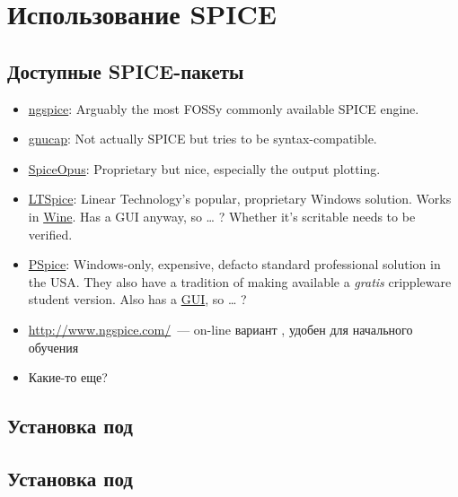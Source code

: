 
\chapter{Использование SPICE}

\section{Доступные SPICE-пакеты}

\begin{itemize}
\item \href{http://ngspice.sourceforge.net/}{ngspice}: Arguably the most FOSSy
commonly available SPICE engine.
\item
\href{https://www.gnu.org/software/gnucap/}{gnucap}:
Not actually SPICE but tries to be syntax-compatible.
\item \href{http://www.spiceopus.si/}{SpiceOpus}: Proprietary but nice,
especially the output plotting.
\item \href{http://www.linear.com/designtools/software/}{LTSpice}: Linear
Technology's popular, proprietary Windows solution.
Works in \href{http://www.winehq.org/}{Wine}. Has a GUI anyway, so … ? Whether
it's scritable needs to be verified.
\item
\href{http://www.cadence.com/products/orcad/pspice_simulation/Pages/default.aspx}{PSpice}:
Windows-only, expensive, defacto standard professional solution in the USA. They
also have a tradition of making available a \emph{gratis} crippleware student
version.
Also has a \underline{GUI}, so … ?
\item \url{http://www.ngspice.com/}\ --- on-line вариант , удобен
для начального обучения
\item Какие-то еще?
\end{itemize}

\section{Установка  под \win}


\section{Установка  под \linux}

